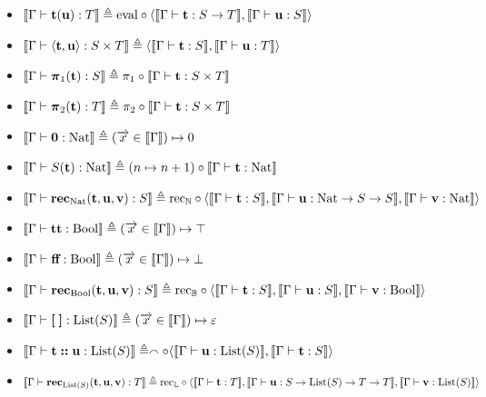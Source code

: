 \documentclass[a4paper,UKenglish,cleveref, autoref, thm-restate]{lipics-v2021}
\begin{document}
\begin{definition}[Semantics]
\begin{itemize}
  \item $\llbracket \Gamma\vdash \mathbf{t}(\mathbf{u}) : T \rrbracket \triangleq \mathrm{eval}\circ \langle\llbracket \Gamma\vdash \mathbf{t} : S \to T \rrbracket, \llbracket \Gamma\vdash \mathbf{u} : S \rrbracket\rangle$
  \item $\llbracket \Gamma\vdash \langle \mathbf{t},\mathbf{u}\rangle : S \times T \rrbracket \triangleq \langle \llbracket \Gamma\vdash \mathbf{t} : S \rrbracket, \llbracket \Gamma\vdash \mathbf{u} : T \rrbracket\rangle$
  \item $\llbracket \Gamma\vdash \boldsymbol{\pi}_1(\mathbf{t}) : S \rrbracket \triangleq \pi_1 \circ \llbracket \Gamma\vdash \mathbf{t} : S \times T \rrbracket$
  \item $\llbracket \Gamma\vdash \boldsymbol{\pi}_2(\mathbf{t}) : T \rrbracket \triangleq \pi_2 \circ \llbracket \Gamma\vdash \mathbf{t} : S \times T \rrbracket$
  \item $\llbracket \Gamma\vdash \boldsymbol{0} : \mathrm{Nat} \rrbracket \triangleq (\overrightarrow{x} \in \llbracket \Gamma \rrbracket) \mapsto 0$
  \item $\llbracket \Gamma\vdash S(\mathbf{t}) : \mathrm{Nat} \rrbracket \triangleq (n \mapsto n + 1) \circ \llbracket \Gamma\vdash \mathbf{t} : \mathrm{Nat} \rrbracket$
  \item$      \llbracket \Gamma\vdash \textbf{rec}_{\mathrm{Nat}}(\mathbf{t},\mathbf{u},\mathbf{v}) : S \rrbracket \triangleq\mathrm{rec}_{\mathbb N}\circ\langle\llbracket \Gamma\vdash \mathbf{t} : S \rrbracket, \llbracket \Gamma\vdash \mathbf{u} : \mathrm{Nat} \to S \to S \rrbracket, \llbracket \Gamma\vdash \mathbf{v} : \mathrm{Nat} \rrbracket\rangle$
        
  \item $\llbracket \Gamma\vdash \textbf{tt} : \mathrm{Bool} \rrbracket \triangleq (\overrightarrow x \in \llbracket \Gamma \rrbracket) \mapsto \top$
  \item $\llbracket \Gamma\vdash \textbf{ff} : \mathrm{Bool} \rrbracket \triangleq (\overrightarrow x \in \llbracket \Gamma \rrbracket) \mapsto \bot$
  \item $\llbracket \Gamma\vdash \textbf{rec}_{\mathrm{Bool}}(\mathbf{t},\mathbf{u},\mathbf{v}) : S \rrbracket \triangleq \mathrm{rec}_{\mathbb B}\circ\langle\llbracket \Gamma\vdash \mathbf{t} : S \rrbracket, \llbracket \Gamma\vdash \mathbf{u} : S \rrbracket, \llbracket \Gamma\vdash \mathbf{v} : \mathrm{Bool} \rrbracket\rangle$
        
  \item $\llbracket \Gamma\vdash \boldsymbol[ \; \boldsymbol] : \mathrm{List}(S) \rrbracket \triangleq (\overrightarrow x \in \llbracket \Gamma \rrbracket) \mapsto \varepsilon$
  \item $\llbracket \Gamma\vdash \mathbf{t} \boldsymbol{::} \mathbf{u} : \mathrm{List}(S) \rrbracket\triangleq \smallfrown \circ \langle\llbracket \Gamma\vdash\mathbf{u} : \mathrm{List}(S) \rrbracket,\llbracket \Gamma\vdash \mathbf{t} : S \rrbracket\rangle$
  \item $\llbracket \Gamma\vdash\textbf{rec}_{\mathrm{List}(S)}(\mathbf{t},\mathbf{u},\mathbf{v}) : T \rrbracket \triangleq    \mathrm{rec}_{\mathbb L}\circ\langle\llbracket \Gamma\vdash \mathbf{t} : T \rrbracket, \llbracket \Gamma\vdash \mathbf{u} : S \to \mathrm{List}(S) \to T \to T \rrbracket, \llbracket \Gamma\vdash \mathbf{v} : \mathrm{List}(S) \rrbracket\rangle$
    

\end{itemize}
\end{definition}
\end{document}
